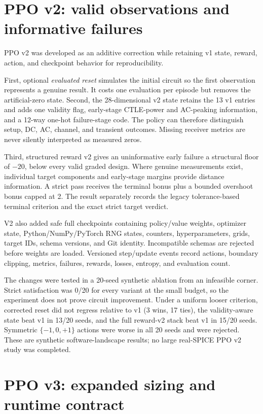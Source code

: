 \section{PPO v2: valid observations and informative failures}

PPO v2 was developed as an additive correction while retaining v1 state, reward,
action, and checkpoint behavior for reproducibility.

First, optional \emph{evaluated reset} simulates the initial circuit so the first
observation represents a genuine result. It costs one evaluation per episode but
removes the artificial-zero state. Second, the 28-dimensional v2 state retains
the 13 v1 entries and adds one validity flag, early-stage CTLE-power and
AC-peaking information, and a 12-way one-hot failure-stage code. The policy can
therefore distinguish setup, DC, AC, channel, and transient outcomes. Missing
receiver metrics are never silently interpreted as measured zeros.

Third, structured reward v2 gives an uninformative early failure a structural
floor of $-20$, below every valid graded design. Where genuine measurements
exist, individual target components and early-stage margins provide distance
information. A strict pass receives the terminal bonus plus a bounded overshoot
bonus capped at 2. The result separately records the legacy tolerance-based
terminal criterion and the exact strict target verdict.

V2 also added safe full checkpoints containing policy/value weights, optimizer
state, Python/NumPy/PyTorch RNG states, counters, hyperparameters, grids, target
IDs, schema versions, and Git identity. Incompatible schemas are rejected before
weights are loaded. Versioned step/update events record actions, boundary
clipping, metrics, failures, rewards, losses, entropy, and evaluation count.

The changes were tested in a 20-seed synthetic ablation from an infeasible
corner. Strict satisfaction was 0/20 for every variant at the small budget, so
the experiment does not prove circuit improvement. Under a uniform looser
criterion, corrected reset did not regress relative to v1 (3 wins, 17 ties), the
validity-aware state beat v1 in 13/20 seeds, and the full reward-v2 stack beat v1
in 15/20 seeds. Symmetric $\{-1,0,+1\}$ actions were worse in all 20 seeds and
were rejected. These are synthetic software-landscape results; no large
real-SPICE PPO v2 study was completed.

\section{PPO v3: expanded sizing and runtime contract}

